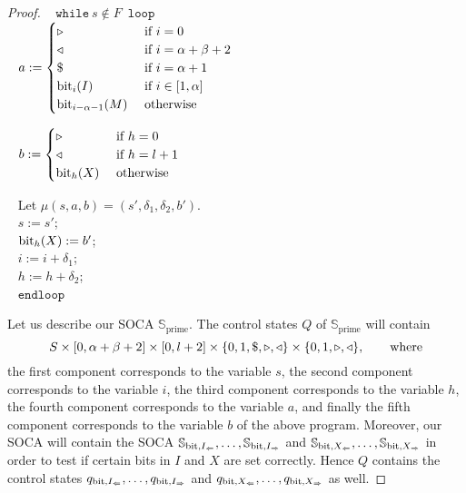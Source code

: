 \documentclass[times,envcountsame]{llncs}
\newcommand{\prim}{\text{prime}}
\newcommand{\Soca}{\mathbb{S}}
\begin{document}
\begin{proof}
\ \hspace{2cm} $\mathtt{while }\  s\not\in F$\ $\mathtt{ loop}$\\[-0.4cm]

\ \hspace{3cm} $a:=\begin{cases} \triangleright& \text{ if }i=0\\
\triangleleft &\text{ if }i=\alpha+\beta+2\\
\$ &\text{ if }i=\alpha+1\\
\text{bit}_i(I) &\text{ if }i\in[1,\alpha]\\
\text{bit}_{i-\alpha-1}(M) &\text{ otherwise }
\end{cases}$

\ \hspace{3cm} $b:=\begin{cases} \triangleright& \text{ if }h=0\\
\triangleleft &\text{ if }h=l+1\\
\text{bit}_{h}(X) &\text{ otherwise }
\end{cases}$




\ \hspace{3cm} Let $\mu(s,a,b)=(s',\delta_1,\delta_2,b')$.\\[-0.4cm]

\ \hspace{3cm} $s:=s '$;\\[-0.4cm]

\ \hspace{3cm} $\text{bit}_h(X):=b'$;\\[-0.4cm]

\ \hspace{3cm} $i:=i+\delta_1$;\\[-0.4cm]

\ \hspace{3cm} $h:=h+\delta_2$;\\[-0.4cm]

\ \hspace{2cm} $\mathtt{end loop}$\\[-0.2cm]

\fi
\newcommand{\inpu}{\text{input}}
\newcommand{\inz}{\text{input}_0}
\newcommand{\ino}{\text{input}_1}
\newcommand{\work}{\text{work}}
\newcommand{\workz}{\text{work}_0}
\newcommand{\worko}{\text{work}_1}


\noindent
Let us describe our SOCA $\Soca_\prim$.
The control states $Q$ of $\Soca_\prim$ will contain
$$
S\times[0,\alpha+\beta+2]\times[0,l+2]\times
\{0,1,\$,\triangleright,\triangleleft\}\times\{0,1,\triangleright,\triangleleft\}, \qquad\text{where}
$$
the first component corresponds to the variable $s$,
the second component corresponds to the variable $i$,
the third component corresponds to the variable $h$,
the fourth component corresponds to the variable $a$, and
finally the fifth component corresponds to the variable $b$
of the above program.
Moreover, our SOCA will contain
the SOCA $\Soca_{\bit,I_\Li},\ldots,\Soca_{\bit,I_\Re}$ and
$\Soca_{\bit,X_\Li},\ldots,\Soca_{\bit,X_\Re}$ in order to test if
certain bits
in $I$ and $X$ are set correctly.
Hence $Q$ contains the control states
$q_{\text{bit},I_\Leftarrow},\ldots,q_{\text{bit},I_\Rightarrow}$ and
$q_{\text{bit},X_\Leftarrow},\ldots,q_{\text{bit},X_\Rightarrow}$ as well.


\end{proof}
\end{document}
